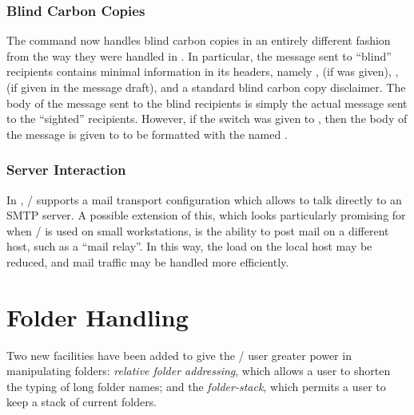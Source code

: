 \subsubsection{Blind Carbon Copies}
The  command now handles blind carbon copies in an entirely
different fashion from the way they were handled in .
In particular,
the message sent to ``blind'' recipients contains minimal information in its
headers,
namely ,
 (if  was given),
,
 (if given in the message draft),
and a standard blind carbon copy disclaimer.
The body of the message sent to the blind recipients is simply the actual
message sent to the ``sighted'' recipients.
However,
if the  switch was given to ,
then the body of the message is given to  to be formatted with the
named .
\subsubsection{Server Interaction}
In , \MH/ supports a mail transport configuration which allows
 to talk directly to an SMTP server.
A possible extension of this,
which looks particularly promising for when \MH/ is used on small
workstations,
is the ability to post mail on a different host,
such as a ``mail relay''.
In this way,
the load on the local host may be reduced,
and mail traffic may be handled more efficiently.
\section{Folder Handling}
Two new facilities have been added to give the \MH/ user greater power in
manipulating folders:
{\it relative folder addressing},
which allows a user to shorten the typing of long folder names;
and the {\it folder-stack},
which permits a user to keep a stack of current folders.
